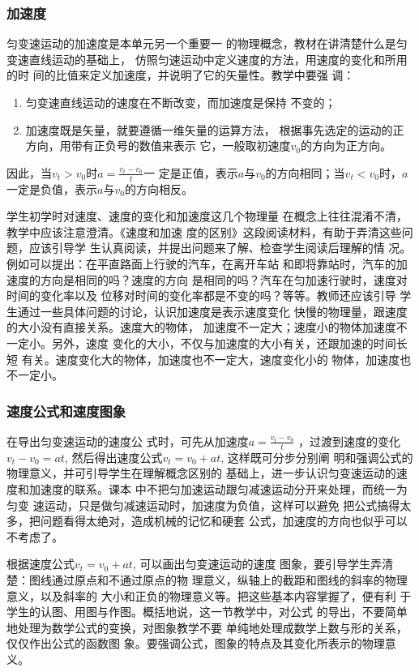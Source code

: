 \subsubsection{加速度}

匀变速运动的加速度是本单元另一个重要一
的物理概念，教材在讲清楚什么是匀变速直线运动的基础上，
仿照匀速运动中定义速度的方法，用速度的变化和所用的时
间的比值来定义加速度，并说明了它的矢量性。教学中要强
调：
\begin{enumerate}
    \item 匀变速直线运动的速度在不断改变，而加速度是保持
不变的；
\item 加速度既是矢量，就要遵循一维矢量的运算方法，
根据事先选定的运动的正方向，用带有正负号的数值来表示
它，一般取初速度$v_0$的方向为正方向。
\end{enumerate}
因此，当$v_t>v_0$时$a=\frac{v_t-v_0}{t}$一
定是正值，表示$a$与$v_0$的方向相同；当$v_t<v_0$时，$a$
一定是负值，表示$a$与$v_0$的方向相反。

学生初学时对速度、速度的变化和加速度这几个物理量
在概念上往往混淆不清，教学中应该注意澄清。《速度和加速
度的区别》这段阅读材料，有助于弄清这些问题，应该引导学
生认真阅读，并提出问题来了解、检查学生阅读后理解的情
况。例如可以提出：在平直路面上行驶的汽车，在离开车站
和即将靠站时，汽车的加速度的方向是相同的吗？速度的方向
是相同的吗？汽车在匀加速行驶时，速度对时间的变化率以及
位移对时间的变化率都是不变的吗？等等。教师还应该引导
学生通过一些具体问题的讨论，认识加速度是表示速度变化
快慢的物理量，跟速度的大小没有直接关系。速度大的物体，
加速度不一定大；速度小的物体加速度不一定小。另外，速度
变化的大小，不仅与加速度的大小有关，还跟加速的时间长短
有关。速度变化大的物体，加速度也不一定大，速度变化小的
物体，加速度也不一定小。

\subsubsection{速度公式和速度图象}
在导出匀变速运动的速度公
式时，可先从加速度$a=\frac{v_t-v_0}{t}$
，过渡到速度的变化$v_t-v_0=at$, 然后得出速度公式$v_t=v_0+at$, 这样既可分步分别阐
明和强调公式的物理意义，并可引导学生在理解概念区别的
基础上，进一步认识匀变速运动的速度和加速度的联系。课本
中不把匀加速运动跟匀减速运动分开来处理，而统一为匀变
速运动，只是做匀减速运动时，加速度为负值，这样可以避免
把公式搞得太多，把问题看得太绝对，造成机械的记忆和硬套
公式，加速度的方向也似乎可以不考虑了。

根据速度公式$v_t=v_0+at$, 可以画出匀变速运动的速度
图象，要引导学生弄清楚：图线通过原点和不通过原点的物
理意义，纵轴上的截距和图线的斜率的物理意义，以及斜率的
大小和正负的物理意义等。把这些基本内容掌握了，便有利
于学生的认图、用图与作图。概括地说，这一节教学中，对公式
的导出，不要简单地处理为数学公式的变换，对图象教学不要
单纯地处理成数学上数与形的关系，仅仅作出公式的函数图
象。要强调公式，图象的特点及其变化所表示的物理意义。


